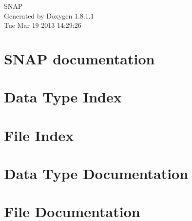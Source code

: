 \documentclass{book}
\begin{document}
\hypersetup{pageanchor=false,citecolor=blue}
\begin{titlepage}
\vspace*{7cm}
\begin{center}
{\Large S\-N\-A\-P }\\
\vspace*{1cm}
{\large Generated by Doxygen 1.8.1.1}\\
\vspace*{0.5cm}
{\small Tue Mar 19 2013 14:29:26}\\
\end{center}
\end{titlepage}
\clearemptydoublepage
{}
\tableofcontents
\clearemptydoublepage
{}
\hypersetup{pageanchor=true,citecolor=blue}
\chapter{S\-N\-A\-P documentation}
\label{index}\hypertarget{index}{}
\chapter{Data Type Index}

\chapter{File Index}

\chapter{Data Type Documentation}



























\chapter{File Documentation}

























\printindex
\end{document}
